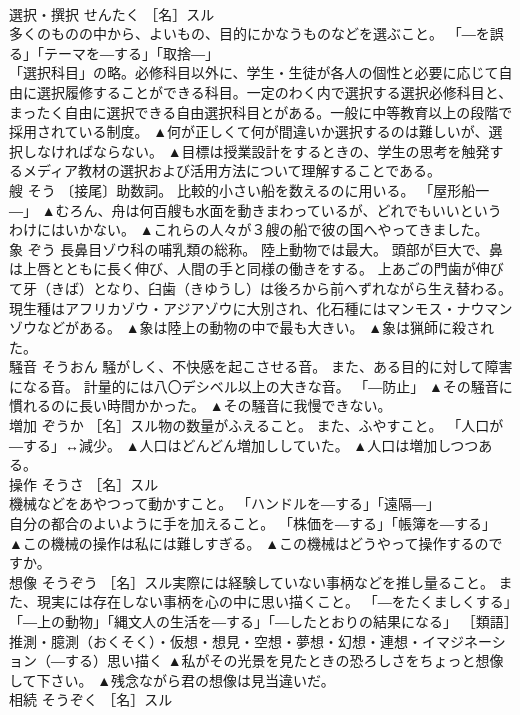 \documentclass[8pt]{extreport}
\begin{document}
\begin{CJK}{UTF8}{min}
\\	選択・撰択	せんたく	［名］スル 
\\	多くのものの中から、よいもの、目的にかなうものなどを選ぶこと。 「―を誤る」「テーマを―する」「取捨―」 
\\	「選択科目」の略。必修科目以外に、学生・生徒が各人の個性と必要に応じて自由に選択履修することができる科目。一定のわく内で選択する選択必修科目と、まったく自由に選択できる自由選択科目とがある。一般に中等教育以上の段階で採用されている制度。	▲何が正しくて何が間違いか選択するのは難しいが、選択しなければならない。 ▲目標は授業設計をするときの、学生の思考を触発するメディア教材の選択および活用方法について理解することである。
\\	艘	そう	〔接尾〕助数詞。 比較的小さい船を数えるのに用いる。 「屋形船一―」	▲むろん、舟は何百艘も水面を動きまわっているが、どれでもいいというわけにはいかない。 ▲これらの人々が３艘の船で彼の国へやってきました。
\\	象	ぞう	長鼻目ゾウ科の哺乳類の総称。 陸上動物では最大。 頭部が巨大で、鼻は上唇とともに長く伸び、人間の手と同様の働きをする。 上あごの門歯が伸びて牙（きば）となり、臼歯（きゆうし）は後ろから前へずれながら生え替わる。 現生種はアフリカゾウ・アジアゾウに大別され、化石種にはマンモス・ナウマンゾウなどがある。	▲象は陸上の動物の中で最も大きい。 ▲象は猟師に殺された。
\\	騒音	そうおん	騒がしく、不快感を起こさせる音。 また、ある目的に対して障害になる音。 計量的には八〇デシベル以上の大きな音。 「―防止」	▲その騒音に慣れるのに長い時間かかった。 ▲その騒音に我慢できない。
\\	増加	ぞうか	［名］スル物の数量がふえること。 また、ふやすこと。 「人口が―する」↔減少。	▲人口はどんどん増加ししていた。 ▲人口は増加しつつある。
\\	操作	そうさ	［名］スル 
\\	機械などをあやつって動かすこと。 「ハンドルを―する」「遠隔―」 
\\	自分の都合のよいように手を加えること。 「株価を―する」「帳簿を―する」	▲この機械の操作は私には難しすぎる。 ▲この機械はどうやって操作するのですか。
\\	想像	そうぞう	［名］スル実際には経験していない事柄などを推し量ること。 また、現実には存在しない事柄を心の中に思い描くこと。 「―をたくましくする」「―上の動物」「縄文人の生活を―する」「―したとおりの結果になる」 ［類語］推測・臆測（おくそく）・仮想・想見・空想・夢想・幻想・連想・イマジネーション（―する）思い描く	▲私がその光景を見たときの恐ろしさをちょっと想像して下さい。 ▲残念ながら君の想像は見当違いだ。
\\	相続	そうぞく	［名］スル 

\end{CJK}
\end{document}
